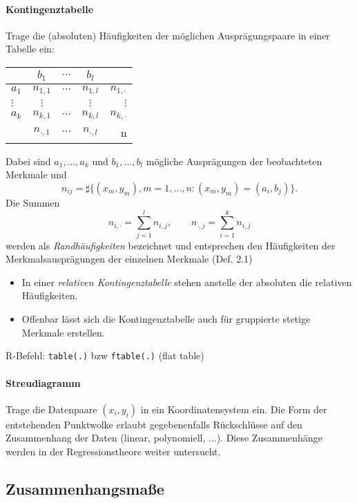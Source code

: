 \paragraph{Kontingenztabelle}
Trage die (absoluten) Häufigkeiten der möglichen Ausprägungspaare in einer
Tabelle ein:
\begin{center}
  \begin{tabular}{l|ccc|r}
    & $b_1$ & $\cdots$ & $b_l$ \\
    \hline
    $a_1$ & $n_{1,1}$ & $\cdots$ & $n_{1,l}$ & $n_{1,\cdot}$ \\
    $\vdots$ & $\vdots$ & & $\vdots$ & $\vdots$ \\
    $a_k$ & $n_{k,1}$ & $\cdots$ & $n_{k,l}$ & $n_{k,\cdot}$ \\
    \hline
    & $n_{\cdot,1}$ & $\cdots$ & $n_{\cdot,l}$ & n
  \end{tabular}
\end{center}
Dabei sind $a_1, \ldots, a_k$ und $b_1, \ldots, b_l$ mögliche Ausprägungen der
beobachteten Merkmale und
\[ n_{ij} = \sharp \{ (x_m, y_m), m = 1, \ldots, n : (x_m,y_m) = (a_i, b_j)
  \}. \]
Die Summen
\[ n_{i,\cdot} = \sum_{j=1}^l n_{i,j}, \qquad n_{\cdot,j} = \sum_{i=1}^k
  n_{i,j} \]
werden als \emph{Randhäufigkeiten} bezeichnet und entsprechen den Häufigkeiten
der Merkmalsausprägungen der einzelnen Merkmale (Def. 2.1)
\begin{itemize}
\item In einer \emph{relativen Kontingenztabelle} stehen anstelle der absoluten
  die relativen Häufigkeiten.
\item Offenbar lässt sich die Kontingenztabelle auch für gruppierte stetige
  Merkmale erstellen.
\end{itemize}

R-Befehl: \verb+table(.)+ bzw \verb+ftable(.)+ (flat table)

\paragraph{Streudiagramm}
Trage die Datenpaare $(x_i, y_i)$ in ein
Koordinatensystem ein. Die Form der entstehenden Punktwolke erlaubt
gegebenenfalls Rückschlüsse auf den Zusammenhang der Daten (linear, polynomiell,
...). Diese Zusammenhänge werden in der Regressionstheore weiter untersucht.

\subsection{Zusammenhangsmaße}
